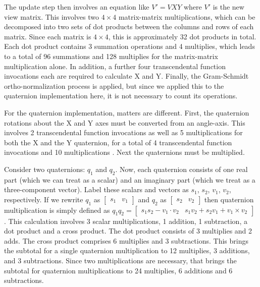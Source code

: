 \documentclass{acm_proc_article-sp}
\begin{document}
The update step then involves an equation like $V\prime = VXY$ where $V\prime$ is the new view matrix.
This involves two $4 \times 4$ matrix-matrix multiplications, which can be decomposed into two sets of dot products between the columns and rows of each matrix.
Since each matrix is $4 \times 4$, this is approximately 32 dot products in total.
Each dot product contains 3 summation operations and 4 multiplies, which leads to a total of 96 summations and 128 multiplies for the matrix-matrix multiplication alone.
In addition, a further four transcendental function invocations each are required to calculate X and Y.
Finally, the Gram-Schmidt ortho-normalization process is applied, but since we applied this to the quaternion implementation here, it is not necessary to count its operations.

For the quaternion implementation, matters are different.
First, the quaternion rotations about the X and Y axes must be converted from an angle-axis.
This involves 2 transcendental function invocations as well as 5 multiplications for both the X and the Y quaternion, for a total of 4 transcendental function invocations and 10 multiplications \cite{glm:quat:angleAxis}.
Next the quaternions must be multiplied.

Consider two quaternions: $q_1$ and $q_2$.
Now, each quaternion consists of one real part (which we can treat as a scalar) and an imaginary part (which we treat as a three-component vector).
Label these scalars and vectors as $s_1$, $s_2$, $v_1$, $v_2$, respectively.
If we rewrite $q_1$ as $\left[ \begin{array}{cc} s_1 & v_1 \end{array} \right]$ and $q_2$ as $\left[ \begin{array}{cc} s_2 & v_2 \end{array} \right]$ then quaternion multiplication is simply defined as $q_1 q_2 = \left[ \begin{array}{cc} s_1 s_2 - v_1 \cdot v_2 & s_1 v_2 + s_2 v_1 + v_1 \times v_2 \end{array} \right]$ \cite{schoemake85}.
This calculation involves 3 scalar multiplications, 1 addition, 1 subtraction, a dot product and a cross product.
The dot product consists of 3 multiplies and 2 adds.
The cross product comprises 6 multiplies and 3 subtractions.
This brings the subtotal for a single quaternion multiplication to 12 multiplies, 3 additions, and 3 subtractions.
Since two multiplications are necessary, that brings the subtotal for quaternion multiplications to 24 multiplies, 6 additions and 6 subtractions.
\end{document}
